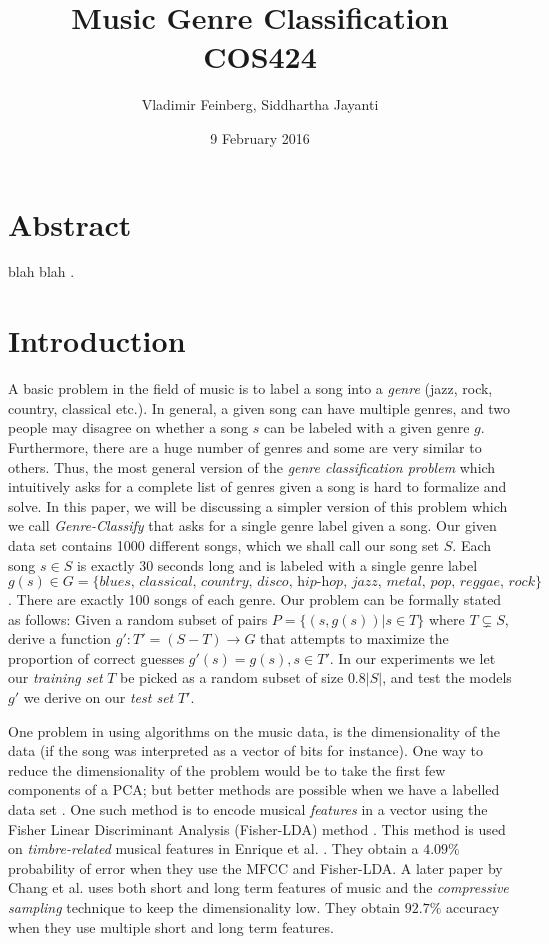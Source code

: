 \documentclass{article}
\title{Music Genre Classification\\\large COS424}
\author{Vladimir Feinberg, Siddhartha Jayanti}
\date{9 February 2016}
\begin{document}
\maketitle

\section{Abstract}

 blah blah \cite{davis2012fractional}.
 
 \section{Introduction}

A basic problem in the field of music is to label a song into a {\em genre} (jazz, rock, country, classical etc.).
In general, a given song can have multiple genres, and two people may disagree on whether a song $s$ can be labeled with a given genre $g$.
Furthermore, there are a huge number of genres and some are very similar to others.
Thus, the most general version of the {\em genre classification problem} which intuitively asks for a complete list of genres given a song is hard to formalize
and solve.
In this paper, we will be discussing a simpler version of this problem which we call {\em Genre-Classify} that asks for a single genre label given a song.
Our given data set contains 1000 different songs, which we shall call our song set $S$.
Each song $s \in S$ is exactly 30 seconds long and is labeled with a single genre label 
$g(s) \in G = \{ \textit{blues, classical, country, disco, hip-hop, jazz, metal, pop, reggae, rock} \}$.
There are exactly 100 songs of each genre.
Our problem can be formally stated as follows:
Given a random subset of pairs $P = \{(s, g(s)) | s \in T \}$ where $T \subsetneq S$, derive a function $g': T' = (S - T) \rightarrow G$ 
that attempts to maximize the proportion of correct guesses $g'(s) = g(s), s \in T'$.
In our experiments we let our {\em training set} $T$ be picked as a random subset of size $0.8 |S|$,
and test the models $g'$ we derive on our {\em test set} $T'$.

One problem in using algorithms on the music data, is the dimensionality of the data (if the song was interpreted as a vector of bits for instance).
One way to reduce the dimensionality of the problem would be to take the first few components of a PCA; 
but better methods are possible when we have a labelled data set \cite{WellingNote}.
One such method is to encode musical {\em features} in a vector using the Fisher Linear Discriminant Analysis (Fisher-LDA) method \cite{WellingNote}.
This method is used on {\em timbre-related} musical features in Enrique et al. \cite{ERLGRR}.
They obtain a $4.09\%$ probability of error when they use the MFCC and Fisher-LDA.
A later paper by Chang et al. \cite{CJI10} uses both short and long term features of music and the {\em compressive sampling} technique to keep
the dimensionality low.
They obtain $92.7\%$ accuracy when they use multiple short and long term features.



\end{document}
